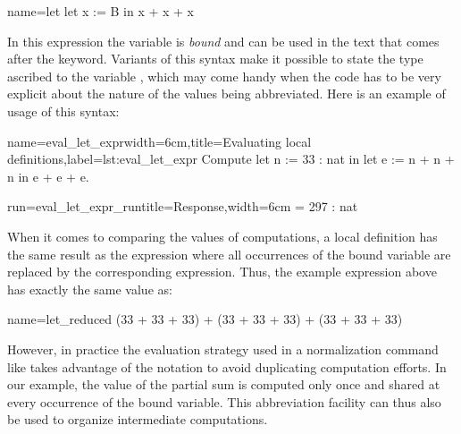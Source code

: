 \begin{coq}{name=let}{}
let x := B in
   x + x + x
\end{coq}

In this expression the variable  is {\em bound} and can be used in
the text that comes after the  keyword.
Variants of this syntax make it possible to state the
type ascribed to the variable , which may come handy when the
code has to be very explicit about the nature of the values being
abbreviated.
Here is an example of usage of this syntax:

\begin{coq-left}{name=eval_let_expr}{width=6cm,title=Evaluating local definitions,label=lst:eval_let_expr}
Compute
  let n := 33 : nat in
  let e := n + n + n in
    e + e + e.
\end{coq-left}
\begin{coqout-right}{run=eval_let_expr_run}{title=Response,width=6cm}
 = 297 : nat
\end{coqout-right}

When it comes to comparing the values of computations, a local definition
has the same result as the expression where all occurrences of the bound
variable are replaced by the corresponding expression.  Thus, the example
expression above has exactly the same value as:

\begin{coq}{name=let_reduced}{}
(33 + 33 + 33) + (33 + 33 + 33) + (33 + 33 + 33)
\end{coq}

However, in practice the evaluation strategy used in a normalization
command like  takes advantage of the
  notation to
avoid duplicating computation efforts. In our example, the value of
the partial sum  is computed only once and shared at
every occurrence of the bound variable. This abbreviation facility can
thus also be used to organize intermediate computations.

